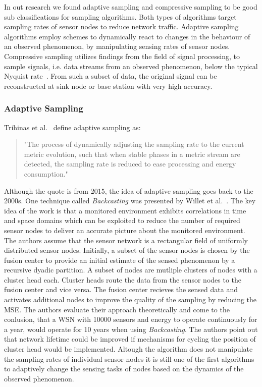In out research we found adaptive sampling and compressive sampling to be good
sub classifications for sampling algorithms. Both types of algorithms target
sampling rates of sensor nodes to reduce network traffic. Adaptive sampling
algorithms employ schemes to dynamically react to changes in the behaviour of
an observed phenomenon, by manipulating sensing rates of sensor nodes.
Compressive sampling utilizes findings from the field of signal processing, to
sample signals, i.e. data streams from an observed phenomenon, below the
typical Nyquist rate~\cite{candes2008introduction}. From such a subset of data,
the original signal can be reconstructed at sink node or base station with very
high accuracy.

\subsubsection{Adaptive Sampling}
\label{sec:Adaptive Sampling}

Trihinas et al.~\cite{trihinas2015adam} define adaptive sampling as:

\begin{quote}
    "The process of dynamically adjusting the sampling rate to the current
    metric evolution, such that when stable phases in a metric stream are
    detected, the sampling rate is reduced to ease processing and energy
    consumption."
\end{quote}

\par
Although the quote is from 2015, the idea of adaptive sampling goes back to the
2000s. One technique called \textit{Backcasting} was presented by Willet et
al.~\cite{willett2004backcasting}. The key idea of the work is that a monitored
environment exhibits correlations in time and space domains which can be
exploited to reduce the number of required sensor nodes to deliver an accurate
picture about the monitored environment. The authors assume that the sensor
network is a rectangular field of uniformly distributed sensor nodes.
Initially, a subset of the sensor nodes is chosen by the fusion center to
provide an initial estimate of the sensed phenomenon by a recursive dyadic
partition. A subset of nodes are mutliple clusters of nodes with a cluster head
each. Cluster heads route the data from the sensor nodes to the fusion center
and vice versa. The fusion center recieves the sensed data and activates
additional nodes to improve the quality of the sampling by reducing the
\ac{MSE}. The authors evaluate their approach theoretically and come to the
conlusion, that a \ac{WSN} with 10000 sensors and energy to operate
continuously for a year, would operate for 10 years when using
\textit{Backcasting}. The authors point out that network lifetime could be
improved if mechanisms for cycling the position of cluster head would be
implemented. Altough the algorithm does not manipulate the sampling rates of
individual sensor nodes it is still one of the first algorithms to adaptively
change the sensing tasks of nodes based on the dynamics of the observed
phenomenon.

